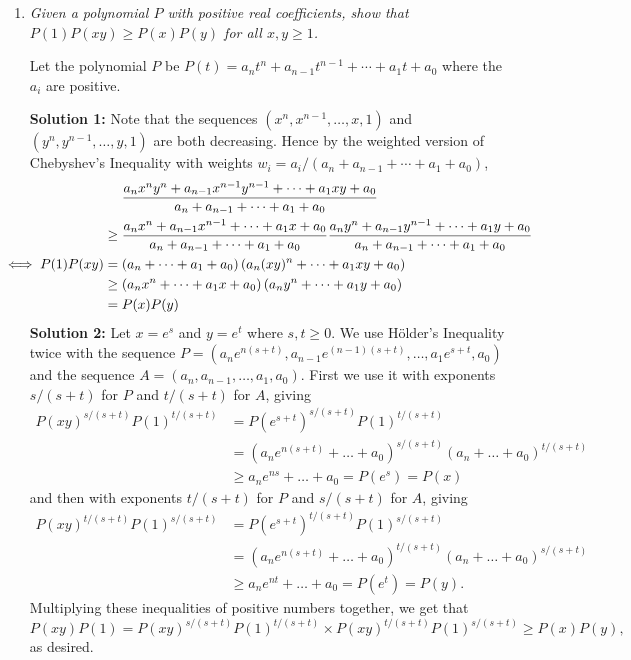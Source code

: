 \documentclass[a4paper,12pt]{article}
\begin{document}
\begin{enumerate}
	
	
	\item
	\textit{Given a polynomial $P$ with positive real coefficients, show that $P(1)P(xy) \geq P(x)P(y)$ for all $x,y \geq 1$.}
	
	Let the polynomial $P$ be $P(t) = a_n t^n +a_{n-1} t^{n-1} +\dotsb +a_1 t +a_0$ where the $a_i$ are positive.
	
	\textbf{Solution 1:} Note that the sequences $(x^n, x^{n-1}, \dotsc, x, 1)$ and $(y^n, y^{n-1}, \dotsc, y, 1)$ are both decreasing. Hence by the weighted version of Chebyshev's Inequality with weights $w_i = a_i/(a_n+a_{n-1}+\dotsb+a_1+a_0)$,
	\begin{align*}
		&\mspace{24mu} \frac{a_n x^ny^n +a_{n-1}x^{n-1}y^{n-1} +\dotsb +a_1 xy +a_0}{a_n+a_{n-1} +\dotsb +a_1 +a_0} \\ &\geq \frac{a_n x^n +a_{n-1}x^{n-1} +\dotsb +a_1 x +a_0}{a_n+a_{n-1} +\dotsb +a_1 +a_0} \frac{a_n y^n +a_{n-1}y^{n-1} +\dotsb +a_1 y +a_0}{a_n+a_{n-1} +\dotsb +a_1 +a_0} \\
		\mspace{-36mu} \iff P(1)P(xy) &= \left(a_n +\dotsb +a_1 +a_0\right) \left(a_n(xy)^n +\dotsb +a_1 xy +a_0\right) \\ &\geq \left(a_nx^n +\dotsb +a_1 x +a_0\right) \left(a_ny^n +\dotsb +a_1 y +a_0\right) \\ &= P(x)P(y)
	\end{align*}
	\textbf{Solution 2:} Let $x = e^s$ and $y = e^t$ where $s,t \geq 0$. We use H\"older's Inequality twice with the sequence $P = (a_n e^{n(s+t)}, a_{n-1} e^{(n-1)(s+t)}, \dotsc, a_1 e^{s+t}, a_0)$ and the sequence $A = (a_n, a_{n-1}, \dotsc, a_1, a_0)$. First we use it with exponents $s/(s+t)$ for $P$ and $t/(s+t)$ for $A$, giving \begin{align*} P(xy)^{s/(s+t)} P(1)^{t/(s+t)} &= P\!\left(e^{s+t}\right)^{s/(s+t)} P(1)^{t/(s+t)} \\ &= \left(a_n e^{n(s+t)} +\dotsc +a_0\right)^{s/(s+t)} \left(a_n +\dotsc +a_0\right)^{t/(s+t)} \\ &\geq a_n e^{ns} +\dotsc +a_0 = P(e^s) = P(x)\end{align*} and then with exponents $t/(s+t)$ for $P$ and $s/(s+t)$ for $A$, giving \begin{align*} P(xy)^{t/(s+t)} P(1)^{s/(s+t)} &= P\!\left(e^{s+t}\right)^{t/(s+t)} P(1)^{s/(s+t)} \\ &= \left(a_n e^{n(s+t)} +\dotsc +a_0\right)^{t/(s+t)} \left(a_n +\dotsc +a_0\right)^{s/(s+t)} \\ &\geq a_n e^{nt} +\dotsc +a_0 = P(e^t) = P(y).\end{align*}
	Multiplying these inequalities of positive numbers together, we get that \[P(xy)P(1) = P(xy)^{s/(s+t)} P(1)^{t/(s+t)} \times P(xy)^{t/(s+t)} P(1)^{s/(s+t)} \geq P(x) P(y),\] as desired.

\end{enumerate}
\end{document}
